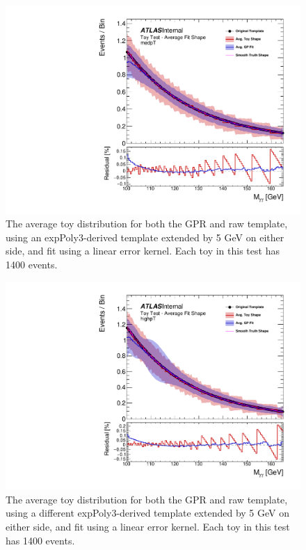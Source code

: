 \begin{figure} 
\begin{center}
  \includegraphics[width=\textwidth]{figures/background/gpr/validation/linear/ToyTest_AvgFitShape_medpT_1400_noSig}   
\caption{The average toy distribution for both the GPR and raw template, using an expPoly3-derived template extended by 5 GeV on either side, and fit using a linear error kernel. Each toy in this test has 1400 events.}
\label{fig:linearkernel_medpt_1400_noSig}
\end{center}
\end{figure}

\begin{figure} 
\begin{center}
  \includegraphics[width=\textwidth]{figures/background/gpr/validation/linear/ToyTest_AvgFitShape_highpT_1400_noSig}   
\caption{The average toy distribution for both the GPR and raw template, using a different expPoly3-derived template extended by 5 GeV on either side, and fit using a linear error kernel. Each toy in this test has 1400 events.}
\label{fig:linearkernel_highpt_1400_noSig}
\end{center}
\end{figure}

